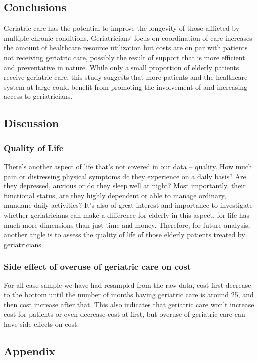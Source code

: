 \documentclass{article}
\begin{document}
	
	\subsection{Conclusions}
	Geriatric care has the potential to improve the longevity of those afflicted by multiple chronic conditions. Geriatricians’ focus on coordination of care increases the amount of healthcare resource utilization but costs are on par with patients not receiving geriatric care, possibly the result of support that is more efficient and preventative in nature. While only a small proportion of elderly patients receive geriatric care, this study suggests that more patients and the healthcare system at large could benefit from promoting the involvement of and increasing access to geriatricians.
	\subsection{Discussion}
	\subsubsection{Quality of Life}
	There’s another aspect of life that’s not covered in our data – quality. How much pain or distressing physical symptoms do they experience on a daily basis? Are they depressed, anxious or do they sleep well at night? Most importantly, their functional status, are they highly dependent or able to manage ordinary, mundane daily activities? It’s also of great interest and importance to investigate whether geriatricians can make a difference for elderly in this aspect, for life has much more dimensions than just time and money. Therefore, for future analysis, another angle is to assess the quality of life of those elderly patients treated by geriatricians.
	\subsubsection{Side effect of overuse of geriatric care on cost}	
	For all case sample we have had resampled from the raw data, cost first decrease to the bottom until the number of months having geriatric care is around 25, and then cost increase after that. This also indicates that geriatric care won’t increase cost for patients or even decrease cost at first, but overuse of geriatric care can have side effects on cost.
	\subsection{Appendix}
\end{document}
